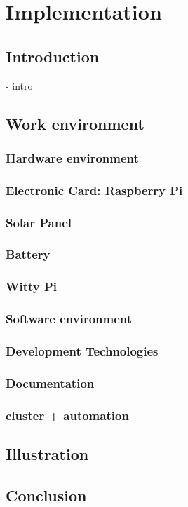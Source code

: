 

\chapter{Implementation}


\section{Introduction}
- intro

\section{Work environment}
    \subsection{Hardware environment}
        \subsection{Electronic Card: Raspberry Pi}
        \subsection{Solar Panel}
        \subsection{Battery}
        \subsection{Witty Pi}
    \subsection{Software environment}
        \subsection{Development Technologies}
        \subsection{Documentation}

    \subsection{cluster + automation}

\section{Illustration}

\section{Conclusion}

